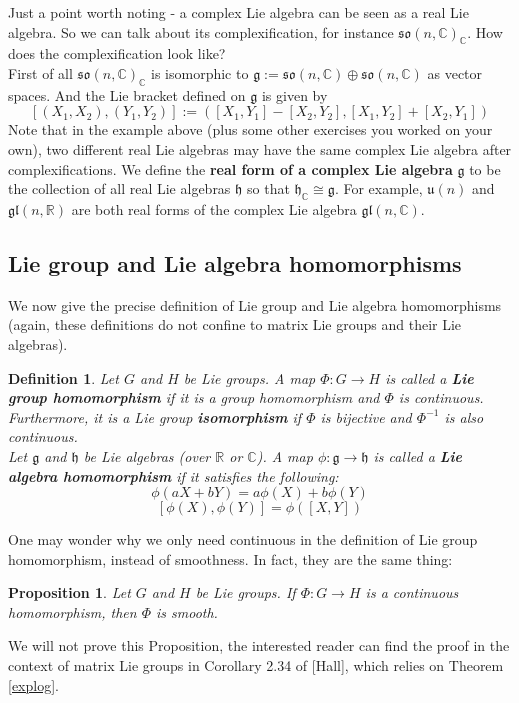 \documentclass[11pt]{article}
\newtheorem{proposition}[theorem]{Proposition}
\newtheorem{definition}[theorem]{Definition}
\newcommand{\bb}[1]{\mathbb{#1}}
\newcommand{\mf}[1]{\mathfrak{#1}}
\begin{document}
Just a point worth noting - a complex Lie algebra can be seen as a real Lie algebra. So we can talk about its complexification, for instance $\mf{so}(n,\bb{C})_{\bb{C}}$. How does the complexification look like?\\
First of all $\mf{so}(n,\bb{C})_{\bb{C}}$ is isomorphic to $\mf{g} := \mf{so}(n,\bb{C}) \oplus \mf{so}(n,\bb{C})$ as vector spaces. And the Lie bracket defined on $\mf{g}$ is given by
$$[(X_1, X_2), (Y_1, Y_2)] := ([X_1,Y_1] - [X_2,Y_2], [X_1,Y_2]+[X_2,Y_1])$$
Note that in the example above (plus some other exercises you worked on your own), two different real Lie algebras may have the same complex Lie algebra after complexifications. We define the \textbf{real form of a complex Lie algebra} $\mf{g}$ to be the collection of all real Lie algebras $\mf{h}$ so that $\mf{h}_{\bb{C}} \cong \mf{g}$. For example, $\mf{u}(n)$ and $\mf{gl}(n,\bb{R})$ are both real forms of the complex Lie algebra $\mf{gl}(n,\bb{C})$.


\subsection{Lie group and Lie algebra homomorphisms} \label{liehom}
We now give the precise definition of Lie group and Lie algebra homomorphisms (again, these definitions do not confine to matrix Lie groups and their Lie algebras).
\begin{definition}
Let $G$ and $H$ be Lie groups. A map $\Phi: G \to H$ is called a \textbf{Lie group homomorphism} if it is a group homomorphism and $\Phi$ is continuous. Furthermore, it is a Lie group \textbf{isomorphism} if $\Phi$ is bijective and $\Phi^{-1}$ is also continuous.\\

\noindent Let $\mf{g}$ and $\mf{h}$ be Lie algebras (over $\bb{R}$ or $\bb{C}$). A map $\phi: \mf{g} \to \mf{h}$ is called a \textbf{Lie algebra homomorphism} if it satisfies the following:
$$\phi(aX+bY) = a\phi(X) + b\phi(Y)$$
$$[\phi(X), \phi(Y)] = \phi([X,Y])$$
\end{definition}

One may wonder why we only need continuous in the definition of Lie group homomorphism, instead of smoothness. In fact, they are the same thing:
\begin{proposition}
Let $G$ and $H$ be Lie groups. If $\Phi: G \to H$ is a continuous homomorphism, then $\Phi$ is smooth.
\end{proposition}
We will not prove this Proposition, the interested reader can find the proof in the context of matrix Lie groups in Corollary 2.34 of [Hall], which relies on Theorem \ref{explog}. \\
\end{document}
